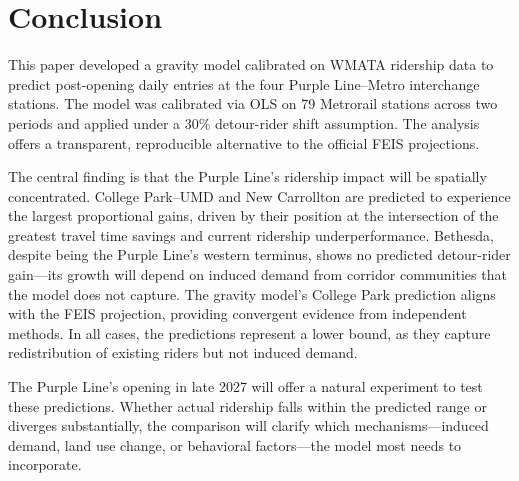 \documentclass[11pt]{article}
\begin{document}
\section{Conclusion}
\label{sec:conclusion}

This paper developed a gravity model calibrated on WMATA ridership data to
predict post-opening daily entries at the four Purple Line--Metro interchange
stations. The model was calibrated via OLS on 79 Metrorail stations across
two periods and applied under a 30\% detour-rider shift assumption. The
analysis offers a transparent, reproducible alternative to the official FEIS
projections.

The central finding is that the Purple Line's ridership impact will be
spatially concentrated. College Park--UMD and New Carrollton are predicted
to experience the largest proportional gains, driven by their position at
the intersection of the greatest travel time savings and current ridership
underperformance. Bethesda, despite being the Purple Line's western
terminus, shows no predicted detour-rider gain---its growth will depend on
induced demand from corridor communities that the model does not capture.
The gravity model's College Park prediction aligns with the FEIS
projection, providing convergent evidence from independent methods. In all
cases, the predictions represent a lower bound, as they capture
redistribution of existing riders but not induced demand.

The Purple Line's opening in late 2027 will offer a natural experiment to
test these predictions. Whether actual ridership falls within the predicted
range or diverges substantially, the comparison will clarify which
mechanisms---induced demand, land use change, or behavioral factors---the
model most needs to incorporate.
\end{document}
